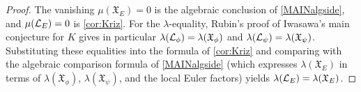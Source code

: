 \begin{proof}
  The vanishing \(\mu(\mathfrak{X}_E) = 0\) is the algebraic conclusion of \cref{MAINalgside}, and \(\mu(\mathcal{L}_E) = 0\) is \cref{cor:Kriz}. For the \(\lambda\)-equality, Rubin's proof of Iwasawa's main conjecture for \(K\) gives in particular \(\lambda(\mathcal{L}_\phi) = \lambda(\mathfrak{X}_\phi)\) and \(\lambda(\mathcal{L}_\psi) = \lambda(\mathfrak{X}_\psi)\). Substituting these equalities into the formula of \cref{cor:Kriz} and comparing with the algebraic comparison formula of \cref{MAINalgside} (which expresses \(\lambda(\mathfrak{X}_E)\) in terms of \(\lambda(\mathfrak{X}_\phi)\), \(\lambda(\mathfrak{X}_\psi)\), and the local Euler factors) yields \(\lambda(\mathcal{L}_E) = \lambda(\mathfrak{X}_E)\).
\end{proof}
